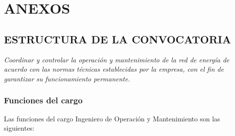 \documentclass[a5paper]{book}%
\begin{document}
\part{ANEXOS}

\chapter*{ESTRUCTURA DE LA CONVOCATORIA}

\textit{Coordinar y controlar la operación y mantenimiento de la red de energía de acuerdo con las normas
	técnicas establecidas por la empresa, con el fin de garantizar su funcionamiento permanente.
}


\section{Funciones del cargo}

Las funciones del cargo Ingeniero de Operación y Mantenimiento  son las siguientes:
\end{document}

